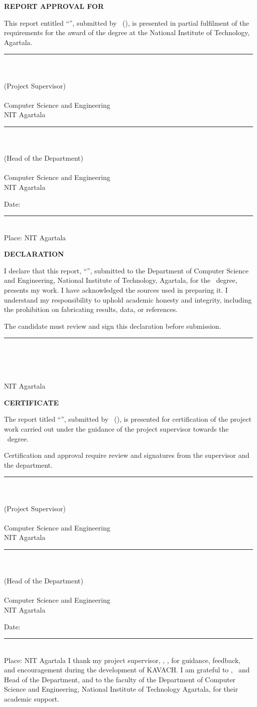 \documentclass[a4paper,12pt]{nitathesis}
\numberwithin{figure}{chapter}
\newcommand{\fronttitle}[1]{\clearpage\thispagestyle{plain}\begin{center}\LARGE\bfseries #1\end{center}\vspace{1.2cm}}
\newcommand{\facultyblock}[3]{\begin{minipage}[t]{0.46\textwidth}\centering\rule{6cm}{0.4pt}\\#1\\#2\\#3\\\small Computer Science and Engineering\\NIT Agartala\end{minipage}}
\begin{document}
\fronttitle{REPORT APPROVAL FOR \DegreeShort}
This report entitled ``\ReportTitle'', submitted by \CandidateName\ (\RollNumber), is presented in partial fulfilment of the requirements for the award of the \textbf{\DegreeName} degree at the National Institute of Technology, Agartala.
\vspace{2.5cm}\par\noindent
\facultyblock{\SupervisorName}{(Project Supervisor)}{\SupervisorDesignation}\hfill\facultyblock{\HodName}{(Head of the Department)}{\HodDesignation}
\vspace{2cm}\par\noindent Date: \rule{5cm}{0.4pt}\\Place: NIT Agartala
\fronttitle{DECLARATION}
I declare that this report, ``\ReportTitle'', submitted to the Department of Computer Science and Engineering, National Institute of Technology, Agartala, for the \DegreeName\ degree, presents my work. I have acknowledged the sources used in preparing it. I understand my responsibility to uphold academic honesty and integrity, including the prohibition on fabricating results, data, or references.

The candidate must review and sign this declaration before submission.
\vspace{2cm}\par\hfill\begin{minipage}{7cm}\centering\rule{6cm}{0.4pt}\\\CandidateName\\\RollNumber\end{minipage}
\vspace{1.2cm}\par\noindent\SubmissionDate\\NIT Agartala
\fronttitle{CERTIFICATE}
The report titled ``\ReportTitle'', submitted by \CandidateName\ (\RollNumber), is presented for certification of the project work carried out under the guidance of the project supervisor towards the \DegreeName\ degree.

Certification and approval require review and signatures from the supervisor and the department.
\vspace{2.5cm}\par\noindent
\facultyblock{\SupervisorName}{(Project Supervisor)}{\SupervisorDesignation}\hfill\facultyblock{\HodName}{(Head of the Department)}{\HodDesignation}
\vspace{2cm}\par\noindent Date: \rule{5cm}{0.4pt}\\Place: NIT Agartala
I thank my project supervisor, \SupervisorName, \SupervisorDesignation, for guidance, feedback, and encouragement during the development of KAVACH. I am grateful to \HodName, \HodDesignation\ and Head of the Department, and to the faculty of the Department of Computer Science and Engineering, National Institute of Technology Agartala, for their academic support.
\end{document}
